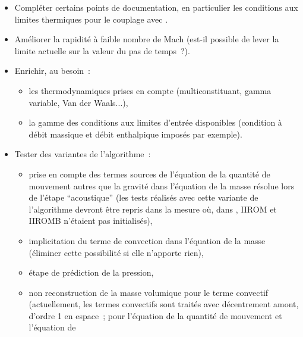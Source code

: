 \begin{itemize}
\begin{itemize}
        la pression d\'epend de la temp\'erature et une simple condition de
        Neumann homog\`ene est susceptible de cr\'eer un terme source de
        quantit\'e de mouvement parasite),
        \item maillage non conforme (non conformit\'e dans la direction
        transverse d'un canal),
      \item ``tube à choc'' avec terme source d'énergie.
        \end{itemize}
\item Compl\'eter certains points de documentation, en particulier les
        conditions aux limites thermiques pour le couplage avec \syrthes.
\item Am\'eliorer la rapidit\'e \`a faible nombre de Mach (est-il
possible de lever la limite
actuelle sur la valeur du pas de temps~?).
\item Enrichir, au besoin~:
        \begin{itemize}
        \item les thermodynamiques prises en compte (multiconstituant,
        gamma variable, Van der Waals...),
        \item la gamme des conditions aux limites d'entr\'ee
        disponibles (condition \`a d\'ebit massique et d\'ebit enthalpique
        impos\'es par exemple).
        \end{itemize}
\item Tester des variantes de l'algorithme~:
        \begin{itemize}
        \item prise en compte des termes sources de l'\'equation de la
        quantit\'e de mouvement autres que la gravit\'e dans l'\'equation de la
        masse r\'esolue lors de l'\'etape ``acoustique'' (les tests r\'ealis\'es
        avec cette variante de l'algorithme devront \^etre repris dans la
        mesure o\`u, dans , IIROM et IIROMB n'\'etaient pas
        initialis\'es),
        \item implicitation du terme de convection dans
        l'\'equation de la masse (\'eliminer cette possibilit\'e si
        elle n'apporte rien),
        \item \'etape de pr\'ediction de la pression,
        \item non reconstruction de la masse volumique pour le terme convectif
        (actuellement, les termes convectifs sont trait\'es avec
        d\'ecentrement amont, d'ordre 1 en espace~;
        pour l'\'equation de la quantit\'e de mouvement et l'\'equation de

\end{itemize}
\end{itemize}
